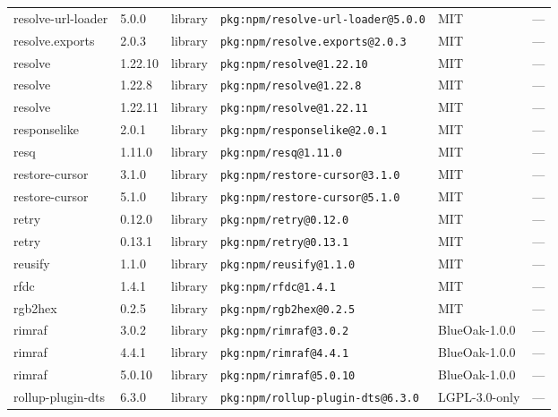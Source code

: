 \documentclass[11pt,a4paper]{article}
\begin{document}
\begin{longtable}{|p{4cm}|p{2cm}|p{1.6cm}|p{5cm}|p{1.5cm}|p{3.5cm}|}
\raggedright resolve-url-loader & 5.0.0 & library & \small\texttt{pkg:npm/resolve-url-loader@5.0.0} & MIT & \small — \\
\raggedright resolve.exports & 2.0.3 & library & \small\texttt{pkg:npm/resolve.exports@2.0.3} & MIT & \small — \\
\raggedright resolve & 1.22.10 & library & \small\texttt{pkg:npm/resolve@1.22.10} & MIT & \small — \\
\raggedright resolve & 1.22.8 & library & \small\texttt{pkg:npm/resolve@1.22.8} & MIT & \small — \\
\raggedright resolve & 1.22.11 & library & \small\texttt{pkg:npm/resolve@1.22.11} & MIT & \small — \\
\raggedright responselike & 2.0.1 & library & \small\texttt{pkg:npm/responselike@2.0.1} & MIT & \small — \\
\raggedright resq & 1.11.0 & library & \small\texttt{pkg:npm/resq@1.11.0} & MIT & \small — \\
\raggedright restore-cursor & 3.1.0 & library & \small\texttt{pkg:npm/restore-cursor@3.1.0} & MIT & \small — \\
\raggedright restore-cursor & 5.1.0 & library & \small\texttt{pkg:npm/restore-cursor@5.1.0} & MIT & \small — \\
\raggedright retry & 0.12.0 & library & \small\texttt{pkg:npm/retry@0.12.0} & MIT & \small — \\
\raggedright retry & 0.13.1 & library & \small\texttt{pkg:npm/retry@0.13.1} & MIT & \small — \\
\raggedright reusify & 1.1.0 & library & \small\texttt{pkg:npm/reusify@1.1.0} & MIT & \small — \\
\raggedright rfdc & 1.4.1 & library & \small\texttt{pkg:npm/rfdc@1.4.1} & MIT & \small — \\
\raggedright rgb2hex & 0.2.5 & library & \small\texttt{pkg:npm/rgb2hex@0.2.5} & MIT & \small — \\
\raggedright rimraf & 3.0.2 & library & \small\texttt{pkg:npm/rimraf@3.0.2} & BlueOak-1.0.0 & \small — \\
\raggedright rimraf & 4.4.1 & library & \small\texttt{pkg:npm/rimraf@4.4.1} & BlueOak-1.0.0 & \small — \\
\raggedright rimraf & 5.0.10 & library & \small\texttt{pkg:npm/rimraf@5.0.10} & BlueOak-1.0.0 & \small — \\
\raggedright rollup-plugin-dts & 6.3.0 & library & \small\texttt{pkg:npm/rollup-plugin-dts@6.3.0} & LGPL-3.0-only & \small — \\

\end{longtable}
\end{document}
